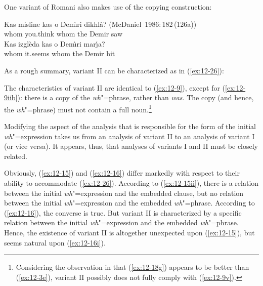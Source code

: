 \documentclass[output=paper]{langsci/langscibook}
\begin{document}
One variant of Romani also makes use of the copying construction:
\begin{exe}
\ex
\label{ex:12-25}
\begin{xlist}
\ex
\label{ex:12-25a}
\gll
Kas misline kas o Dem\`{\i}ri dikhl\^a? (McDaniel~1986:\,182\,(126a))\hspace{-1ex}\\
       whom you.think whom the Demir saw \\
\ex
\label{ex:12-25b}
\gll
Kas izgl\`eda kas o Dem\`{\i}ri mar\'{\j}a? \\
whom it.seems whom the Demir hit \\
\end{xlist}
\end{exe}
As a rough summary, variant II can be characterized as in (\ref{ex:12-26}):
\begin{exe}
\ex
\label{ex:12-26}
The characteristics of variant II are identical to (\ref{ex:12-9}), except for
(\ref{ex:12-9iib}): there is a copy of the \emph{wh}"=phrase, rather than
\textit{was}. The copy (and hence, the \emph{wh}"=phrase) must not
contain a full noun.\footnote{%
	Considering the observation in \citet[247f.]{McDaniel1986} that (\ref{ex:12-18g}) appears to be better than (\ref{ex:12-3e}), variant
  II possibly does not fully comply with (\ref{ex:12-9v}).%
}
\end{exe}
Modifying the aspect of the analysis that is responsible for the form
of the initial \emph{wh}"=expression takes us from an analysis of
variant II to an analysis of variant I (or vice versa). It appears,
thus, that analyses of variants I and II must be closely related.

Obviously, (\ref{ex:12-15}) and (\ref{ex:12-16}) differ markedly with respect to their ability
to accommodate (\ref{ex:12-26}). According to (\ref{ex:12-15ii}), there is a relation between the initial \emph{wh}"=expression and the embedded clause, but no
relation between the initial \emph{wh}"=expression and the embedded \emph{wh}"=phrase. According to (\ref{ex:12-16}), the converse is true. But variant II
is characterized by a specific relation between the initial \emph{wh}"=expression and the embedded \emph{wh}"=phrase. Hence, the
existence of variant II is altogether unexpected upon (\ref{ex:12-15}), but seems
natural upon (\ref{ex:12-16i}).
\end{document}
